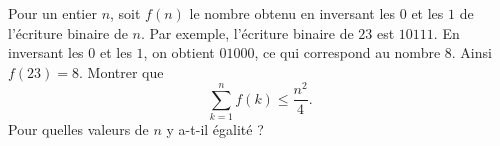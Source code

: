 Pour un entier $n$, soit $f(n)$ le nombre obtenu en inversant les $0$ et les $1$ de l'écriture binaire de $n$. Par exemple, l'écriture binaire de $23$ est $10111$. En inversant les $0$ et les $1$, on obtient $01000$, ce qui correspond au nombre $8$. Ainsi $f(23)=8$. Montrer que
$$\sum_{k=1}^n f(k) \le \frac{n^2}{4}.$$
Pour quelles valeurs de $n$ y a-t-il égalité ?
